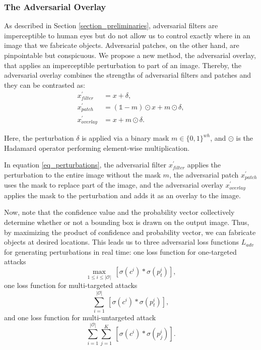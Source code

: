
\subsubsection{The Adversarial Overlay}

As described in Section \ref{section_preliminaries}, adversarial filters are imperceptible to human eyes but do not allow us to control exactly where in an image that we fabricate objects. Adversarial patches, 
on the other hand, are pinpointable but conspicuous. We propose a new method, the adversarial overlay, that applies an imperceptible perturbation to part of an image. Thereby, the adversarial overlay combines the strengths of adversarial filters and patches and they can be contrasted as: 
\begin{subequations}
\label{eq_perturbations}
\begin{align}
    x^{'}_{filter} &= x + \delta, \\
    x^{'}_{patch} &= (\mathds{1}-m) \odot x + m \odot \delta, \\
    x^{'}_{overlay} &= x + m \odot \delta.
\end{align}
\end{subequations}

Here, the perturbation $\delta$ is applied via a binary mask $m \in \{0, 1\}^{wh}$, and $\odot$ is the Hadamard operator performing element-wise multiplication. 

In equation \eqref{eq_perturbations}, the adversarial filter $x^{'}_{filter}$ applies the perturbation to the entire image without the mask $m$, the adversarial patch $x^{'}_{patch}$ uses the mask to replace part of the image, and the adversarial overlay $x^{'}_{overlay}$ applies the mask to the perturbation and adds it as an overlay to the image.

Now, note that the confidence value and the probability vector collectively determine whether or not a bounding box is drawn on the output image. Thus, by maximizing the product of confidence and probability vector, we can fabricate objects at desired locations. This leads us to three adversarial loss functions $L_{adv}$ for generating perturbations in real time: one loss function for one-targeted attacks
\setcounter{equation}{2}
\begin{equation}
\max_{1 \leq i \leq |\mathcal{O}|}\ [\sigma(c^i) * \sigma(p^i_t)] \label{eq:one-targeted},
\end{equation}
one loss function for multi-targeted attacks 
\begin{equation}
\sum^{|\mathcal{O}|}_{i = 1}\ [\sigma(c^i) * \sigma(p^i_t)] \label{eq:multi-targeted},    
\end{equation}
and one loss function for multi-untargeted attack
\begin{equation}
\sum^{|\mathcal{O}|}_{i = 1} \sum_{j=1}^{K}\ [\sigma(c^i) *\sigma(p^i_j)] \label{eq:multi-untargeted}.    
\end{equation}

